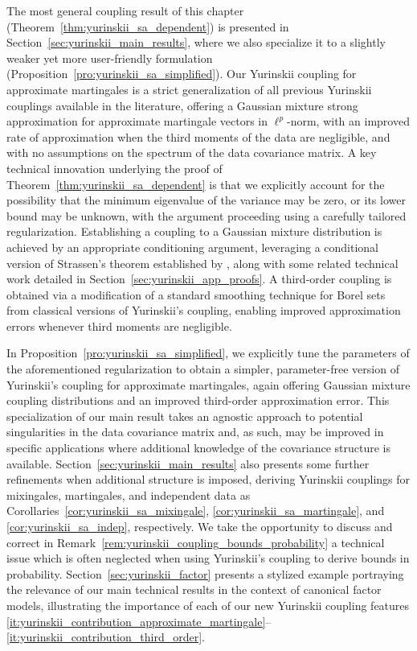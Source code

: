 The most general coupling result of this chapter
(Theorem~\ref{thm:yurinskii_sa_dependent}) is presented in
Section~\ref{sec:yurinskii_main_results}, where we also specialize it to a
slightly
weaker yet more user-friendly formulation
(Proposition~\ref{pro:yurinskii_sa_simplified}). Our Yurinskii coupling for
approximate
martingales is a strict generalization of all previous Yurinskii couplings
available in the literature, offering a Gaussian mixture strong approximation
for approximate martingale vectors in $\ell^p$-norm, with an improved rate of
approximation when the third moments of the data are negligible, and with no
assumptions on the spectrum of the data covariance matrix. A key technical
innovation underlying the proof of Theorem~\ref{thm:yurinskii_sa_dependent} is
that we
explicitly account for the possibility that the minimum eigenvalue of the
variance may be zero, or its lower bound may be unknown, with the argument
proceeding using a carefully tailored regularization. Establishing a coupling
to a Gaussian mixture distribution is achieved by an appropriate conditioning
argument, leveraging a conditional version of Strassen's theorem established by
\citet{chen2020jackknife}, along with some related technical work detailed in
Section~\ref{sec:yurinskii_app_proofs}.
A third-order coupling is obtained via
a modification of a standard smoothing technique for Borel sets from classical
versions of Yurinskii's coupling, enabling improved approximation errors
whenever third moments are negligible.

In Proposition~\ref{pro:yurinskii_sa_simplified}, we explicitly tune the
parameters of
the aforementioned regularization to obtain a simpler, parameter-free version
of Yurinskii's coupling for approximate martingales, again offering Gaussian
mixture coupling distributions and an improved third-order approximation error.
This specialization of our main result takes an agnostic approach to potential
singularities in the data covariance matrix and, as such, may be improved in
specific applications where additional knowledge of the covariance structure is
available. Section~\ref{sec:yurinskii_main_results} also presents some further
refinements when additional structure is imposed, deriving Yurinskii couplings
for mixingales, martingales, and independent data as
Corollaries~\ref{cor:yurinskii_sa_mixingale},
\ref{cor:yurinskii_sa_martingale}, and
\ref{cor:yurinskii_sa_indep}, respectively. We take the opportunity to discuss
and correct
in Remark~\ref{rem:yurinskii_coupling_bounds_probability} a technical issue
which is
often neglected \citep{pollard2002user, li2020uniform} when using Yurinskii's
coupling to derive bounds in probability. Section~\ref{sec:yurinskii_factor}
presents a
stylized example portraying the relevance of our main technical results in the
context of canonical factor models, illustrating the importance of each of our
new Yurinskii coupling features
\ref{it:yurinskii_contribution_approximate_martingale}--%
\ref{it:yurinskii_contribution_third_order}.

